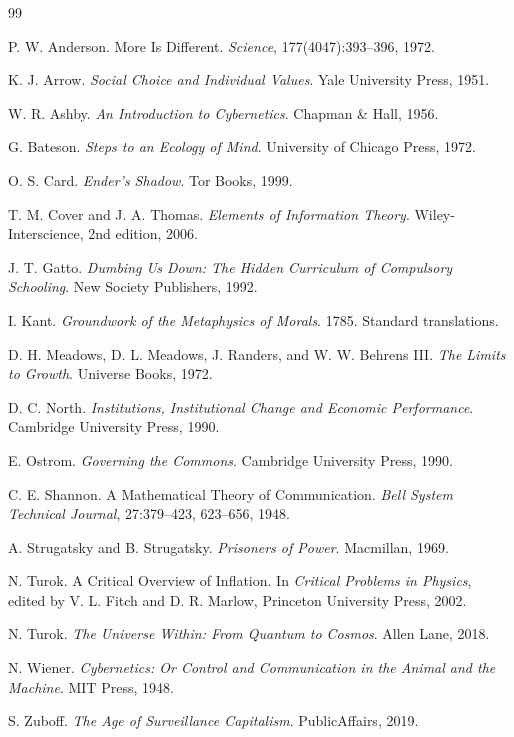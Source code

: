 \documentclass[12pt]{article}
\begin{document}
\newpage
\begin{thebibliography}{99}

P. W. Anderson.
More Is Different.
\emph{Science}, 177(4047):393--396, 1972.

K. J. Arrow.
\emph{Social Choice and Individual Values}.
Yale University Press, 1951.

W. R. Ashby.
\emph{An Introduction to Cybernetics}.
Chapman \& Hall, 1956.

G. Bateson.
\emph{Steps to an Ecology of Mind}.
University of Chicago Press, 1972.

O. S. Card.
\emph{Ender’s Shadow}.
Tor Books, 1999.

T. M. Cover and J. A. Thomas.
\emph{Elements of Information Theory}.
Wiley-Interscience, 2nd edition, 2006.

J. T. Gatto.
\emph{Dumbing Us Down: The Hidden Curriculum of Compulsory Schooling}.
New Society Publishers, 1992.

I. Kant.
\emph{Groundwork of the Metaphysics of Morals}.
1785. Standard translations.

D. H. Meadows, D. L. Meadows, J. Randers, and W. W. Behrens III.
\emph{The Limits to Growth}.
Universe Books, 1972.

D. C. North.
\emph{Institutions, Institutional Change and Economic Performance}.
Cambridge University Press, 1990.

E. Ostrom.
\emph{Governing the Commons}.
Cambridge University Press, 1990.

C. E. Shannon.
A Mathematical Theory of Communication.
\emph{Bell System Technical Journal}, 27:379--423, 623--656, 1948.

A. Strugatsky and B. Strugatsky.
\emph{Prisoners of Power}.
Macmillan, 1969.

N. Turok.
A Critical Overview of Inflation.
In \emph{Critical Problems in Physics}, edited by V. L. Fitch and D. R. Marlow,
Princeton University Press, 2002.

N. Turok.
\emph{The Universe Within: From Quantum to Cosmos}.
Allen Lane, 2018.

N. Wiener.
\emph{Cybernetics: Or Control and Communication in the Animal and the Machine}.
MIT Press, 1948.

S. Zuboff.
\emph{The Age of Surveillance Capitalism}.
PublicAffairs, 2019.

\end{thebibliography}
\end{document}
